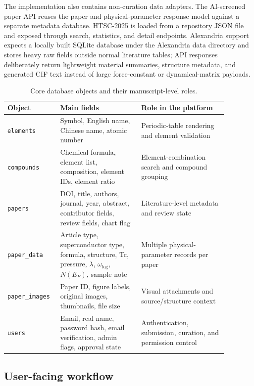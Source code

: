 \documentclass[11pt,a4paper]{article}
\begin{document}
The implementation also contains non-curation data adapters. The AI-screened paper API reuses the paper and physical-parameter response model against a separate metadata database. HTSC-2025 is loaded from a repository JSON file and exposed through search, statistics, and detail endpoints. Alexandria support expects a locally built SQLite database under the Alexandria data directory and stores heavy raw fields outside normal literature tables; API responses deliberately return lightweight material summaries, structure metadata, and generated CIF text instead of large force-constant or dynamical-matrix payloads.

\begin{table}[t]
\centering
\caption{Core database objects and their manuscript-level roles.}
\label{tab:model}
\begin{tabular}{>{\raggedright\arraybackslash}p{0.18\linewidth} >{\raggedright\arraybackslash}p{0.34\linewidth} >{\raggedright\arraybackslash}p{0.36\linewidth}}
\toprule
Object & Main fields & Role in the platform \\
\midrule
\texttt{elements} & Symbol, English name, Chinese name, atomic number & Periodic-table rendering and element validation \\
\texttt{compounds} & Chemical formula, element list, composition, element IDs, element ratio & Element-combination search and compound grouping \\
\texttt{papers} & DOI, title, authors, journal, year, abstract, contributor fields, review fields, chart flag & Literature-level metadata and review state \\
\texttt{paper\_data} & Article type, superconductor type, formula, structure, Tc, pressure, $\lambda$, $\omega_{\log}$, $N(E_F)$, sample note & Multiple physical-parameter records per paper \\
\texttt{paper\_images} & Paper ID, figure labels, original images, thumbnails, file size & Visual attachments and source/structure context \\
\texttt{users} & Email, real name, password hash, email verification, admin flags, approval state & Authentication, submission, curation, and permission control \\
\bottomrule
\end{tabular}
\end{table}

\subsection{User-facing workflow}
\end{document}
